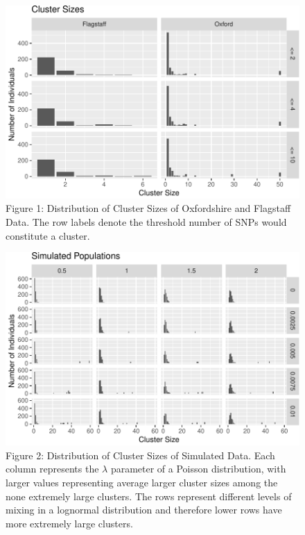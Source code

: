 \documentclass[]{article}
\begin{document}
\begin{figure}
\centering
\includegraphics{Paper_files/figure-latex/fig1-1.pdf}
\caption{\label{fig:fig1}Figure 1: Distribution of Cluster Sizes of
Oxfordshire and Flagstaff Data. The row labels denote the threshold
number of SNPs would constitute a cluster.}
\end{figure}

\begin{figure}
\centering
\includegraphics{Paper_files/figure-latex/fig2-1.pdf}
\caption{\label{fig:fig2}Figure 2: Distribution of Cluster Sizes of
Simulated Data. Each column represents the \(\lambda\) parameter of a
Poisson distribution, with larger values representing average larger
cluster sizes among the none extremely large clusters. The rows
represent different levels of mixing in a lognormal distribution and
therefore lower rows have more extremely large clusters.}
\end{figure}
\end{document}
